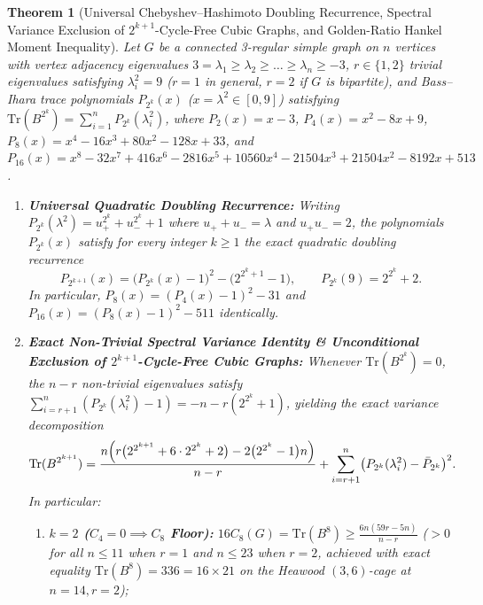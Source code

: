 \documentclass[10pt,a4paper]{article}
\newtheorem{theorem}{Theorem}[section]
\theoremstyle{definition}
\theoremstyle{remark}
\begin{document}
\begin{theorem}[Universal Chebyshev--Hashimoto Doubling Recurrence, Spectral Variance Exclusion of $2^{k+1}$-Cycle-Free Cubic Graphs, and Golden-Ratio Hankel Moment Inequality]\label{thm:doubling_hankel}
Let $G$ be a connected 3-regular simple graph on $n$ vertices with vertex adjacency eigenvalues $3 = \lambda_1 \ge \lambda_2 \ge \dots \ge \lambda_n \ge -3$, $r \in \{1, 2\}$ trivial eigenvalues satisfying $\lambda_i^2 = 9$ ($r = 1$ in general, $r = 2$ if $G$ is bipartite), and Bass--Ihara trace polynomials $P_{2^k}(x)$ ($x = \lambda^2 \in [0, 9]$) satisfying $\mathrm{Tr}(B^{2^k}) = \sum_{i=1}^n P_{2^k}(\lambda_i^2)$, where $P_2(x) = x - 3$, $P_4(x) = x^2 - 8x + 9$, $P_8(x) = x^4 - 16x^3 + 80x^2 - 128x + 33$, and $P_{16}(x) = x^8 - 32x^7 + 416x^6 - 2816x^5 + 10560x^4 - 21504x^3 + 21504x^2 - 8192x + 513$.
\begin{enumerate}[label=(\alph*),nosep]
  \item \textbf{Universal Quadratic Doubling Recurrence:} Writing $P_{2^k}(\lambda^2) = u_+^{2^k} + u_-^{2^k} + 1$ where $u_+ + u_- = \lambda$ and $u_+ u_- = 2$, the polynomials $P_{2^k}(x)$ satisfy for every integer $k \ge 1$ the exact quadratic doubling recurrence
  \begin{equation}\label{eq:doubling}
    P_{2^{k+1}}(x) = \bigl(P_{2^k}(x) - 1\bigr)^2 - \bigl(2^{2^k + 1} - 1\bigr), \qquad P_{2^k}(9) = 2^{2^k} + 2.
  \end{equation}
  In particular, $P_8(x) = (P_4(x) - 1)^2 - 31$ and $P_{16}(x) = (P_8(x) - 1)^2 - 511$ identically.
  \item \textbf{Exact Non-Trivial Spectral Variance Identity \& Unconditional Exclusion of $2^{k+1}$-Cycle-Free Cubic Graphs:} Whenever $\mathrm{Tr}(B^{2^k}) = 0$, the $n - r$ non-trivial eigenvalues satisfy $\sum_{i=r+1}^n (P_{2^k}(\lambda_i^2) - 1) = -n - r(2^{2^k} + 1)$, yielding the exact variance decomposition
  \begin{equation}\label{eq:variance_floor}
    \mathrm{Tr}(B^{2^{k+1}}) = \frac{n \Bigl(r\bigl(2^{2^{k+1}} + 6 \cdot 2^{2^k} + 2\bigr) - 2\bigl(2^{2^k} - 1\bigr) n\Bigr)}{n - r} + \sum_{i=r+1}^n \bigl(P_{2^k}(\lambda_i^2) - \bar{P}_{2^k}\bigr)^2.
  \end{equation}
  In particular:
  \begin{enumerate}[label=(\roman*),nosep]
    \item \textbf{$k = 2$ ($C_4 = 0 \implies C_8$ Floor):} $16 C_8(G) = \mathrm{Tr}(B^8) \ge \frac{6n(59r - 5n)}{n - r}$ ($> 0$ for all $n \le 11$ when $r = 1$ and $n \le 23$ when $r = 2$, achieved with \emph{exact equality} $\mathrm{Tr}(B^8) = 336 = 16 \times 21$ on the Heawood $(3,6)$-cage at $n = 14, r = 2$);

\end{enumerate}
\end{enumerate}
\end{theorem}
\end{document}
